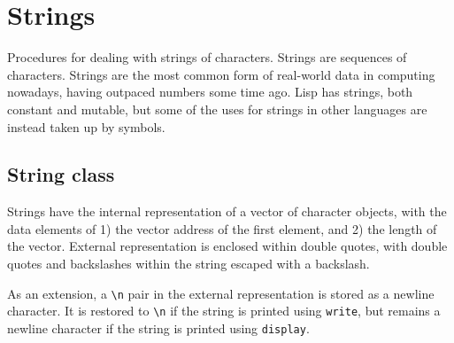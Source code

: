 \documentclass[twoside]{report}
\begin{document}
\section{Strings}
\label{strings}

Procedures for dealing with strings of characters. Strings are sequences of characters. Strings are the most common form of real-world data in computing nowadays, having outpaced numbers some time ago. Lisp has strings, both constant and mutable, but some of the uses for strings in other languages are instead taken up by symbols.

\subsection{String class}
\label{string-class}

Strings have the internal representation of a vector of character objects, with the data elements of 1) the vector address of the first element, and 2) the length of the vector. External representation is enclosed within double quotes, with double quotes and backslashes within the string escaped with a backslash.

As an extension, a \texttt{\textbackslash n} pair in the external representation is stored as a newline character. It is restored to \texttt{\textbackslash n} if the string is printed using \texttt{write}, but remains a newline character if the string is printed using \texttt{display}.
\end{document}
